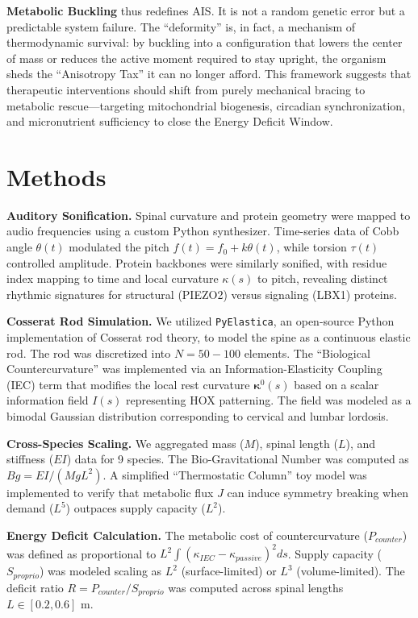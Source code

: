\documentclass[11pt]{article}
\begin{document}
\textbf{Metabolic Buckling} thus redefines AIS. It is not a random genetic error but a predictable system failure. The ``deformity'' is, in fact, a mechanism of thermodynamic survival: by buckling into a configuration that lowers the center of mass or reduces the active moment required to stay upright, the organism sheds the ``Anisotropy Tax'' it can no longer afford. This framework suggests that therapeutic interventions should shift from purely mechanical bracing to metabolic rescue—targeting mitochondrial biogenesis, circadian synchronization, and micronutrient sufficiency to close the Energy Deficit Window.

\section*{Methods}

\textbf{Auditory Sonification.} Spinal curvature and protein geometry were mapped to audio frequencies using a custom Python synthesizer. Time-series data of Cobb angle $\theta(t)$ modulated the pitch $f(t) = f_0 + k \theta(t)$, while torsion $\tau(t)$ controlled amplitude. Protein backbones were similarly sonified, with residue index mapping to time and local curvature $\kappa(s)$ to pitch, revealing distinct rhythmic signatures for structural (PIEZO2) versus signaling (LBX1) proteins.

\textbf{Cosserat Rod Simulation.} We utilized \texttt{PyElastica}\cite{tekinalp2023}, an open-source Python implementation of Cosserat rod theory, to model the spine as a continuous elastic rod. The rod was discretized into $N=50-100$ elements. The ``Biological Countercurvature'' was implemented via an Information-Elasticity Coupling (IEC) term that modifies the local rest curvature $\bm{\kappa}^0(s)$ based on a scalar information field $I(s)$ representing HOX patterning. The field was modeled as a bimodal Gaussian distribution corresponding to cervical and lumbar lordosis.

\textbf{Cross-Species Scaling.} We aggregated mass ($M$), spinal length ($L$), and stiffness ($EI$) data for 9 species. The Bio-Gravitational Number was computed as $Bg = EI / (M g L^2)$. A simplified ``Thermostatic Column'' toy model was implemented to verify that metabolic flux $J$ can induce symmetry breaking when demand ($L^5$) outpaces supply capacity ($L^2$).

\textbf{Energy Deficit Calculation.} The metabolic cost of countercurvature ($P_{counter}$) was defined as proportional to $L^2 \int (\kappa_{IEC} - \kappa_{passive})^2 ds$. Supply capacity ($S_{proprio}$) was modeled scaling as $L^2$ (surface-limited) or $L^3$ (volume-limited). The deficit ratio $R = P_{counter} / S_{proprio}$ was computed across spinal lengths $L \in [0.2, 0.6]$ m.
\end{document}
